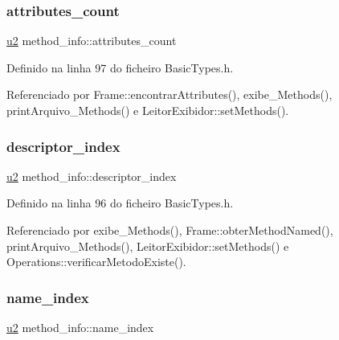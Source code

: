 \mbox{\label{structmethod__info_ad9e5e1e2fc850806addadd6deab8565d}} 
\subsubsection{\texorpdfstring{attributes\+\_\+count}{attributes\_count}}
{\footnotesize\ttfamily \hyperlink{BasicTypes_8h_a732cde1300aafb73b0ea6c2558a7a54f}{u2} method\+\_\+info\+::attributes\+\_\+count}



Definido na linha 97 do ficheiro Basic\+Types.\+h.



Referenciado por Frame\+::encontrar\+Attributes(), exibe\+\_\+\+Methods(), print\+Arquivo\+\_\+\+Methods() e Leitor\+Exibidor\+::set\+Methods().

\mbox{\label{structmethod__info_a7713103e0c8d060630ad62774fb9be37}} 
\subsubsection{\texorpdfstring{descriptor\+\_\+index}{descriptor\_index}}
{\footnotesize\ttfamily \hyperlink{BasicTypes_8h_a732cde1300aafb73b0ea6c2558a7a54f}{u2} method\+\_\+info\+::descriptor\+\_\+index}



Definido na linha 96 do ficheiro Basic\+Types.\+h.



Referenciado por exibe\+\_\+\+Methods(), Frame\+::obter\+Method\+Named(), print\+Arquivo\+\_\+\+Methods(), Leitor\+Exibidor\+::set\+Methods() e Operations\+::verificar\+Metodo\+Existe().

\mbox{\label{structmethod__info_ab91d62d0658b77bba83f6bb685e3bbb9}} 
\subsubsection{\texorpdfstring{name\+\_\+index}{name\_index}}
{\footnotesize\ttfamily \hyperlink{BasicTypes_8h_a732cde1300aafb73b0ea6c2558a7a54f}{u2} method\+\_\+info\+::name\+\_\+index}



